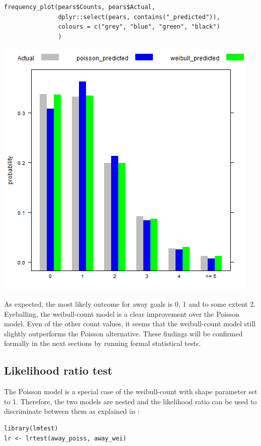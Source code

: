 \documentclass[a4paper,twoside,11pt]{article}
\begin{document}
\begin{verbatim}
frequency_plot(pears$Counts, pears$Actual,
               dplyr::select(pears, contains("_predicted")),
               colours = c("grey", "blue", "green", "black")
               )
\end{verbatim}

\begin{center}
\includegraphics[width=.9\linewidth]{foot_hist.png}
\end{center}



As expected, the most likely outcome for away goals is 0, 1 and to some
extent 2. Eyeballing, the weibull-count model is a clear improvement 
over the Poisson model. Even of the other count values, it seems that the
weibull-count model still slightly outperforms the Poisson alternative. These
findings will be confirmed formally in the next sections by running formal
statistical tests.

\subsection{Likelihood ratio test}
\label{sec:orgb2f7206}
The Poisson model is a special case of the weibull-count with shape parameter
set to 1. Therefore, the two models are nested and the likelihood ratio can be
used to discriminate between them as explained in \citet[Chapter 6]{cameron2013regression}:
\begin{verbatim}
library(lmtest)
lr <- lrtest(away_poiss, away_wei)
\end{verbatim}
\end{document}
